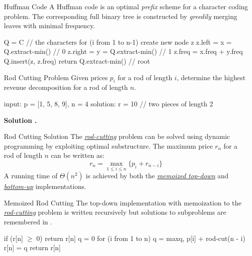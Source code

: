 \documentclass{cognito}
\begin{document}

\begin{note}{Huffman Code}
	A Huffman code is an optimal \emph{prefix} scheme for a character coding problem.
	The corresponding full binary tree is constructed by \emph{greedily} merging leaves with minimal frequency.
	
	\begin{largecode}
 Q = C  // the characters
 for (i from 1 to n-1)
 	create new node z
	z.left = x = Q.extract-min()  // 0
	z.right = y = Q.extract-min() // 1
	z.freq = x.freq + y.freq
	Q.insert(z, z.freq)
 return Q.extract-min()  // root
	\end{largecode}
	\vspace{-5pt}
\end{note}

\begin{note}{Rod Cutting Problem}
	Given prices $p_i$ for a rod of length $i$, determine the highest revenue decomposition for
	a rod of length $n$.
	\begin{largecode}
 input:    p = [1, 5, 8, 9], n = 4
 solution: r = 10  // two pieces of length 2
	\end{largecode}
	\bf Solution \hyperref[note:Rod Cutting Solution]{\solutionref}.
\end{note}

\begin{note}{Rod Cutting Solution}
	The \hyperref[note:Rod Cutting Problem]{\it rod-cutting} problem can be solved using dynamic programming
	by exploiting optimal substructure.
	The maximum price $r_n$ for a rod of length $n$ can be written as:
	$$ r_n = \max_{1 \leq i \leq n} \{ p_i + r_{n-i} \} $$
	A running time of $\Theta(n^2)$ is achieved by both the \hyperref[note:Memoized Rod Cutting]{\it memoized top-down} and
	\hyperref[note:Bottom-Up Rod Cutting]{\it bottom-up} implementations.
	
\end{note}

\begin{note}{Memoized Rod Cutting}
	The top-down implementation  with memoization to the \hyperref[note:Rod Cutting Problem]{\it rod-cutting} problem
	 is written recursively but solutions to subproblems are remembered in .
	 
	 \begin{largecode}
 if (r[n] $\geq$ 0) return r[n]
 q = 0
 for (i from 1 to n)
	q = max{q, p[i] + rod-cut(n - i)}
 r[n] = q
 return r[n]
	\end{largecode}
	\vspace{-5pt}
\end{note}
\end{document}
